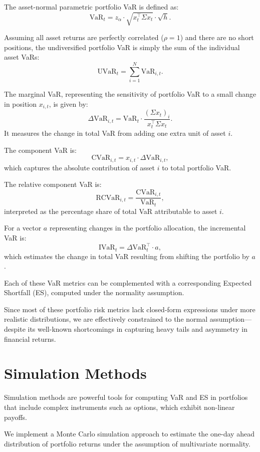 \documentclass[12pt]{article}
\begin{document}
The asset-normal parametric portfolio VaR is defined as:
\[
  \text{VaR}_t = z_\alpha \cdot \sqrt{x_t^\top \Sigma x_t} \cdot \sqrt{h}.
\]

Assuming all asset returns are perfectly correlated (\( \rho = 1 \)) and there are no short positions, the undiversified portfolio VaR is simply the sum of the individual asset VaRs:
\[
  \text{UVaR}_t = \sum_{i=1}^N \text{VaR}_{i,t}.
\]

The marginal VaR, representing the sensitivity of portfolio VaR to a small change in position \( x_{i,t} \), is given by:
\[
  \Delta \text{VaR}_{i,t} = \text{VaR}_t \cdot \frac{(\Sigma x_t)_i}{x_t^\top \Sigma x_t}.
\]
It measures the change in total VaR from adding one extra unit of asset \( i \).

The component VaR is:
\[
  \text{CVaR}_{i,t} = x_{i,t} \cdot \Delta \text{VaR}_{i,t},
\]
which captures the absolute contribution of asset \( i \) to total portfolio VaR.

The relative component VaR is:
\[
  \text{RCVaR}_{i,t} = \frac{\text{CVaR}_{i,t}}{\text{VaR}_t},
\]
interpreted as the percentage share of total VaR attributable to asset \( i \).

For a vector \( a \) representing changes in the portfolio allocation, the incremental VaR is:
\[
  \text{IVaR}_t = \Delta \text{VaR}_t^\top \cdot a,
\]
which estimates the change in total VaR resulting from shifting the portfolio by \( a \).

Each of these VaR metrics can be complemented with a corresponding Expected Shortfall (ES), computed under the normality assumption.

Since most of these portfolio risk metrics lack closed-form expressions under more realistic distributions, we are effectively constrained to the normal assumption—despite its well-known shortcomings in capturing heavy tails and asymmetry in financial returns.


\section{Simulation Methods}

Simulation methods are powerful tools for computing VaR and ES in portfolios that include complex instruments such as options, which exhibit non-linear payoffs.

We implement a Monte Carlo simulation approach to estimate the one-day ahead distribution of portfolio returns under the assumption of multivariate normality. 
\end{document}
